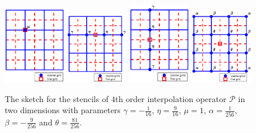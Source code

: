 \begin{figure}[htbp]
	\centering
	\includegraphics[width=0.24\textwidth,trim={1.8cm 0.8cm 1.4cm 1.2cm}, clip]{interpolation1.eps}
	\includegraphics[width=0.24\textwidth,trim={1.8cm 0.8cm 1.4cm 1.2cm}, clip]{interpolation2.eps}
	\includegraphics[width=0.24\textwidth,trim={1.8cm 0.8cm 1.4cm 1.2cm}, clip]{interpolation3.eps}
	\includegraphics[width=0.24\textwidth,trim={1.8cm 0.8cm 1.4cm 1.2cm}, clip]{interpolation4.eps}
	\caption{The sketch for the stencils of $4$th order interpolation operator $\mathcal{P}$ in two dimensions with parameters $\gamma = -\frac{1}{16}$, $\eta = \frac{9}{16}$, $\mu = 1$, $\alpha = \frac{1}{256}$, $\beta = -\frac{9}{256}$ and $\theta = \frac{81}{256}$. }\label{interpolation}
\end{figure}
